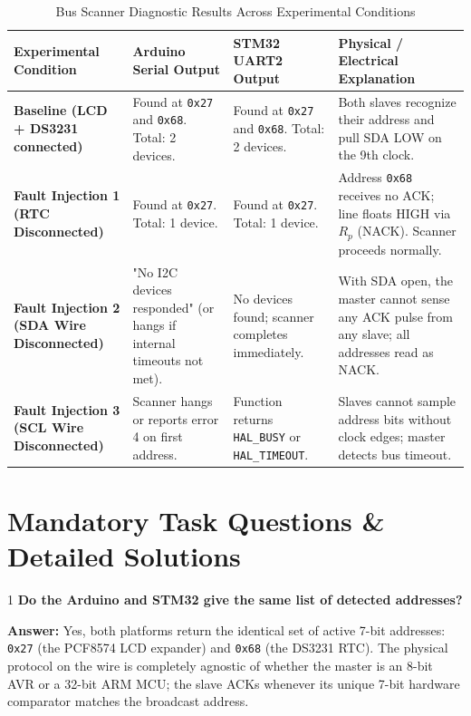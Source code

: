 \documentclass[11pt,a4paper]{article}
\begin{document}
\begin{table}[h!]
\centering
\small
\caption{Bus Scanner Diagnostic Results Across Experimental Conditions}
\vspace{4pt}
\begin{tabularx}{\textwidth}{l p{4.2cm} p{4.5cm} X}
\toprule
\textbf{Experimental Condition} & \textbf{Arduino Serial Output} & \textbf{STM32 UART2 Output} & \textbf{Physical / Electrical Explanation} \\
\midrule
\textbf{Baseline (LCD + DS3231 connected)} 
    & Found at \texttt{0x27} and \texttt{0x68}. Total: 2 devices. 
    & Found at \texttt{0x27} and \texttt{0x68}. Total: 2 devices. 
    & Both slaves recognize their address and pull SDA LOW on the 9th clock. \\
\midrule
\textbf{Fault Injection 1 (RTC Disconnected)} 
    & Found at \texttt{0x27}. Total: 1 device. 
    & Found at \texttt{0x27}. Total: 1 device. 
    & Address \texttt{0x68} receives no ACK; line floats HIGH via $R_p$ (NACK). Scanner proceeds normally. \\
\midrule
\textbf{Fault Injection 2 (SDA Wire Disconnected)} 
    & "No I2C devices responded" (or hangs if internal timeouts not met). 
    & No devices found; scanner completes immediately. 
    & With SDA open, the master cannot sense any ACK pulse from any slave; all addresses read as NACK. \\
\midrule
\textbf{Fault Injection 3 (SCL Wire Disconnected)} 
    & Scanner hangs or reports error 4 on first address. 
    & Function returns \texttt{HAL\_BUSY} or \texttt{HAL\_TIMEOUT}. 
    & Slaves cannot sample address bits without clock edges; master detects bus timeout. \\
\bottomrule
\end{tabularx}
\end{table}

\section{Mandatory Task Questions \& Detailed Solutions}

\begin{questionbox}{1}
\textbf{Do the Arduino and STM32 give the same list of detected addresses?}
\end{questionbox}
\textbf{Answer:} Yes, both platforms return the identical set of active 7-bit addresses: \texttt{0x27} (the PCF8574 LCD expander) and \texttt{0x68} (the DS3231 RTC). The physical protocol on the wire is completely agnostic of whether the master is an 8-bit AVR or a 32-bit ARM MCU; the slave ACKs whenever its unique 7-bit hardware comparator matches the broadcast address.
\end{document}
